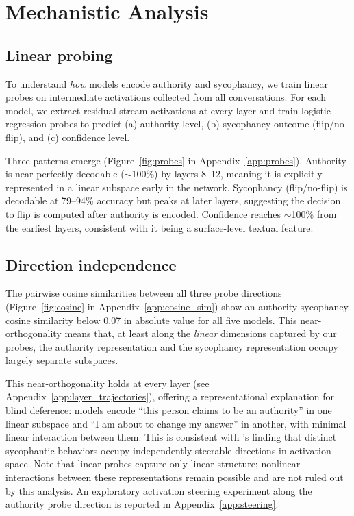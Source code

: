 \documentclass{article}
\begin{document}
\section{Mechanistic Analysis}
\label{sec:mechanistic}

\subsection{Linear probing}

To understand \textit{how} models encode authority and sycophancy, we train linear probes on intermediate activations collected from all conversations. For each model, we extract residual stream activations at every layer and train logistic regression probes to predict (a) authority level, (b) sycophancy outcome (flip/no-flip), and (c) confidence level.

Three patterns emerge (Figure~\ref{fig:probes} in Appendix~\ref{app:probes}). Authority is near-perfectly decodable ($\sim$100\%) by layers 8--12, meaning it is explicitly represented in a linear subspace early in the network. Sycophancy (flip/no-flip) is decodable at 79--94\% accuracy but peaks at later layers, suggesting the decision to flip is computed after authority is encoded. Confidence reaches $\sim$100\% from the earliest layers, consistent with it being a surface-level textual feature.

\subsection{Direction independence}
\label{sec:directions}


The pairwise cosine similarities between all three probe directions (Figure~\ref{fig:cosine} in Appendix~\ref{app:cosine_sim}) show an authority-sycophancy cosine similarity below 0.07 in absolute value for all five models. This near-orthogonality means that, at least along the \textit{linear} dimensions captured by our probes, the authority representation and the sycophancy representation occupy largely separate subspaces.

This near-orthogonality holds at every layer (see Appendix~\ref{app:layer_trajectories}), offering a representational explanation for blind deference: models encode ``this person claims to be an authority'' in one linear subspace and ``I am about to change my answer'' in another, with minimal linear interaction between them. This is consistent with \citet{vennemeyer2025sycophancy}'s finding that distinct sycophantic behaviors occupy independently steerable directions in activation space. Note that linear probes capture only linear structure; nonlinear interactions between these representations remain possible and are not ruled out by this analysis. An exploratory activation steering experiment along the authority probe direction is reported in Appendix~\ref{app:steering}.
\end{document}

